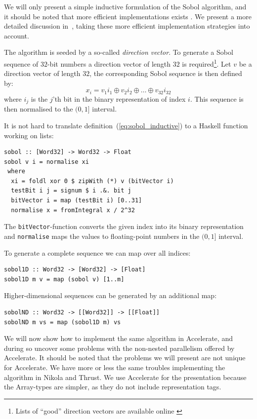 \documentclass[preprint]{sigplanconf}
\begin{document}
We will only present a simple inductive formulation of the Sobol
algorithm, and it should be noted that more efficient implementations
exists \cite{bratley1988algorithm, hwy2011emerald}. We present a more
detailed discussion in~\cite{dybdalcarlsen2013thesis}, taking these
more efficient implementation strategies into account.

The algorithm is seeded by a so-called \emph{direction vector}. To
generate a Sobol sequence of $32$-bit numbers a direction vector of
length $32$ is required\footnote{Lists of ``good'' direction vectors are
  available online \cite{homepage:sobol:directionvectors}}. Let $v$ be
a direction vector of length $32$, the corresponding Sobol sequence is
then defined by:
\begin{equation}
x_i = v_1i_1 \oplus v_2i_2 \oplus \ldots \oplus v_{32}i_{32}\label{eq:sobol_inductive}
\end{equation}
where $i_j$ is the $j$'th bit in the binary representation of index
$i$. This sequence is then normalised to the $(0,1]$ interval.

It is not hard to translate definition~(\ref{eq:sobol_inductive}) to a
Haskell function working on lists:
\begin{verbatim}
sobol :: [Word32] -> Word32 -> Float
sobol v i = normalise xi
 where
  xi = foldl xor 0 $ zipWith (*) v (bitVector i)
  testBit i j = signum $ i .&. bit j
  bitVector i = map (testBit i) [0..31]
  normalise x = fromIntegral x / 2^32
\end{verbatim}
The \verb|bitVector|-function converts the given index into its binary
representation and \verb|normalise| maps the values to floating-point
numbers in the $(0,1]$ interval.

To generate a complete sequence we can map over all indices:
\begin{verbatim}
sobol1D :: Word32 -> [Word32] -> [Float]
sobol1D m v = map (sobol v) [1..m]
\end{verbatim}
Higher-dimensional sequences can be generated by an additional map:
\begin{verbatim}
sobolND :: Word32 -> [[Word32]] -> [[Float]]
sobolND m vs = map (sobol1D m) vs
\end{verbatim}

We will now show how to implement the same algorithm in Accelerate,
and during so uncover some problems with the non-nested parallelism
offered by Accelerate. It should be noted that the problems we will
present are not unique for Accelerate. We have more or less the same
troubles implementing the algorithm in Nikola and Thrust. We use
Accelerate for the presentation because the Array-types are simpler,
as they do not include representation tags.
\end{document}
